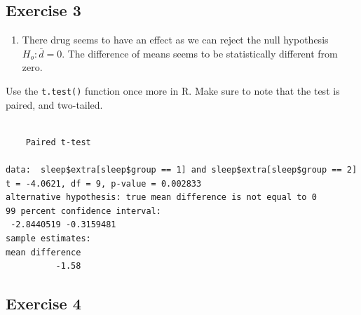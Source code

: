 \documentclass[
  letterpaper,
  DIV=11,
  numbers=noendperiod]{scrreprt}
\newenvironment{Shaded}{\begin{snugshade}}{\end{snugshade}}
\newcommand{\AttributeTok}[1]{\textcolor[rgb]{0.40,0.45,0.13}{#1}}
\newcommand{\DecValTok}[1]{\textcolor[rgb]{0.68,0.00,0.00}{#1}}
\newcommand{\FloatTok}[1]{\textcolor[rgb]{0.68,0.00,0.00}{#1}}
\newcommand{\FunctionTok}[1]{\textcolor[rgb]{0.28,0.35,0.67}{#1}}
\newcommand{\NormalTok}[1]{\textcolor[rgb]{0.00,0.23,0.31}{#1}}
\newcommand{\SpecialCharTok}[1]{\textcolor[rgb]{0.37,0.37,0.37}{#1}}
\newcommand{\StringTok}[1]{\textcolor[rgb]{0.13,0.47,0.30}{#1}}
\providecommand{\tightlist}{%
  \setlength{\itemsep}{0pt}\setlength{\parskip}{0pt}}\usepackage{longtable,booktabs,array}
\begin{document}
\hypertarget{exercise-3-27}{%
\subsection*{Exercise 3}\label{exercise-3-27}}

\begin{blackbox}

\begin{enumerate}
\def\labelenumi{\arabic{enumi}.}
\tightlist
\item
  There drug seems to have an effect as we can reject the null
  hypothesis \(H_{o}:\bar {d} = 0\). The difference of means seems to be
  statistically different from zero.
\end{enumerate}

\end{blackbox}

Use the \texttt{t.test()} function once more in R. Make sure to note
that the test is paired, and two-tailed.

\begin{Shaded}
\end{Shaded}

\begin{verbatim}

    Paired t-test

data:  sleep$extra[sleep$group == 1] and sleep$extra[sleep$group == 2]
t = -4.0621, df = 9, p-value = 0.002833
alternative hypothesis: true mean difference is not equal to 0
99 percent confidence interval:
 -2.8440519 -0.3159481
sample estimates:
mean difference 
          -1.58 
\end{verbatim}

\hypertarget{exercise-4-15}{%
\subsection*{Exercise 4}\label{exercise-4-15}}
\end{document}
